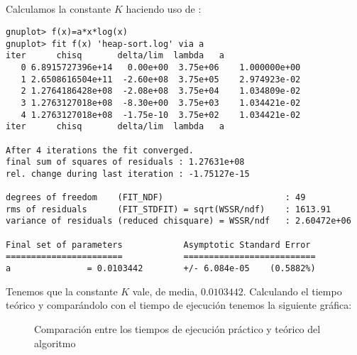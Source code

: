 \pagebreak

\subsection{}\label{eficiencia-oculta-heapsort}

Calculamos la constante $K$ haciendo uso de :

\begin{lstlisting}
gnuplot> f(x)=a*x*log(x)
gnuplot> fit f(x) 'heap-sort.log' via a
iter      chisq       delta/lim  lambda   a
   0 6.8915727396e+14   0.00e+00  3.75e+06    1.000000e+00
   1 2.6508616504e+11  -2.60e+08  3.75e+05    2.974923e-02
   2 1.2764186428e+08  -2.08e+08  3.75e+04    1.034809e-02
   3 1.2763127018e+08  -8.30e+00  3.75e+03    1.034421e-02
   4 1.2763127018e+08  -1.75e-10  3.75e+02    1.034421e-02
iter      chisq       delta/lim  lambda   a

After 4 iterations the fit converged.
final sum of squares of residuals : 1.27631e+08
rel. change during last iteration : -1.75127e-15

degrees of freedom    (FIT_NDF)                        : 49
rms of residuals      (FIT_STDFIT) = sqrt(WSSR/ndf)    : 1613.91
variance of residuals (reduced chisquare) = WSSR/ndf   : 2.60472e+06

Final set of parameters            Asymptotic Standard Error
=======================            ==========================
a               = 0.0103442        +/- 6.084e-05    (0.5882%)
\end{lstlisting}

Tenemos que la constante $K$ vale, de media, $0.0103442$.
Calculando el tiempo teórico y comparándolo con el tiempo de ejecución tenemos la siguiente gráfica:

\begin{figure}[h]
\begin{center}
\end{center}
\caption{Comparación entre los tiempos de ejecución práctico y teórico del algoritmo }
\end{figure}
